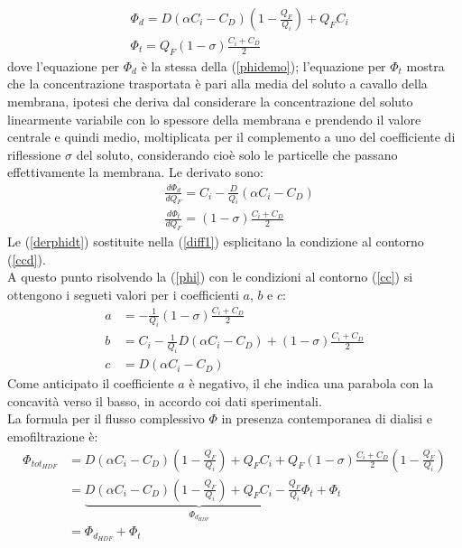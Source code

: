 	\begin{subequations}\label{phidt}
		\begin{align}
			&\Phi_d = D (\alpha C_i - C_D)(1-\frac{Q_F}{Q_i}) + Q_F C_i\\
			&\Phi_t = Q_F (1-\sigma) \frac{C_i+C_D}{2}\label{phit}
		\end{align}
	\end{subequations}
dove l'equazione per $\Phi_d$ è la stessa della (\ref{phidemo}); l'equazione per $\Phi_t$ mostra che la concentrazione trasportata è pari alla media del soluto a cavallo della membrana, ipotesi che deriva dal considerare la concentrazione del soluto linearmente variabile con lo spessore della membrana e prendendo il valore centrale e quindi medio, moltiplicata per il complemento a uno del coefficiente di riflessione $\sigma$ del soluto, considerando cioè solo le particelle che passano effettivamente la membrana. Le derivato sono:
\begin{subequations}\label{derphidt}
		\begin{align}
			&\frac{d\Phi_d}{dQ_F} = C_i -\frac{D}{Q_i}(\alpha C_i - C_D)\\
			&\frac{d\Phi_t}{dQ_F} = (1-\sigma)\frac{C_i+C_D}{2}
		\end{align}
	\end{subequations}
Le (\ref{derphidt}) sostituite nella (\ref{diff1}) esplicitano la condizione al contorno (\ref{ccd}).\\
\newline
A questo punto risolvendo la (\ref{phi}) con le condizioni al contorno (\ref{cc}) si ottengono i segueti valori per i coefficienti $a$, $b$ e $c$:\\
\begin{align*}
	a& = -\frac{1}{Q_i}(1-\sigma)\frac{C_i+C_D}{2}\\
	b& = C_i - \frac{1}{Q_i}D(\alpha C_i - C_D)+ (1-\sigma)\frac{C_i+C_D}{2}\\
	c& = D(\alpha C_i - C_D)
\end{align*}
Come anticipato il coefficiente $a$ è negativo, il che indica una parabola con la concavità verso il basso, in accordo coi dati sperimentali.\\
La formula per il flusso complessivo $\Phi$ in presenza contemporanea di dialisi e emofiltrazione è:
\begin{equation}\label{phihdf}
	\begin{split}
		\Phi_{tot_{HDF}}& = D(\alpha C_i - C_D)(1-\frac{Q_F}{Q_i})+Q_F C_i + Q_F(1-\sigma)\frac{C_i+C_D}{2}(1-\frac{Q_F}{Q_i})\\
		                & = \underbrace{D(\alpha C_i - C_D)(1-\frac{Q_F}{Q_i})+Q_F C_i - \frac{Q_F}{Q_i}\Phi_t}_{\Phi_{d_{HDF}}} + \Phi_t\\
		                & = \Phi_{d_{HDF}} + \Phi_t
	\end{split}
\end{equation}
